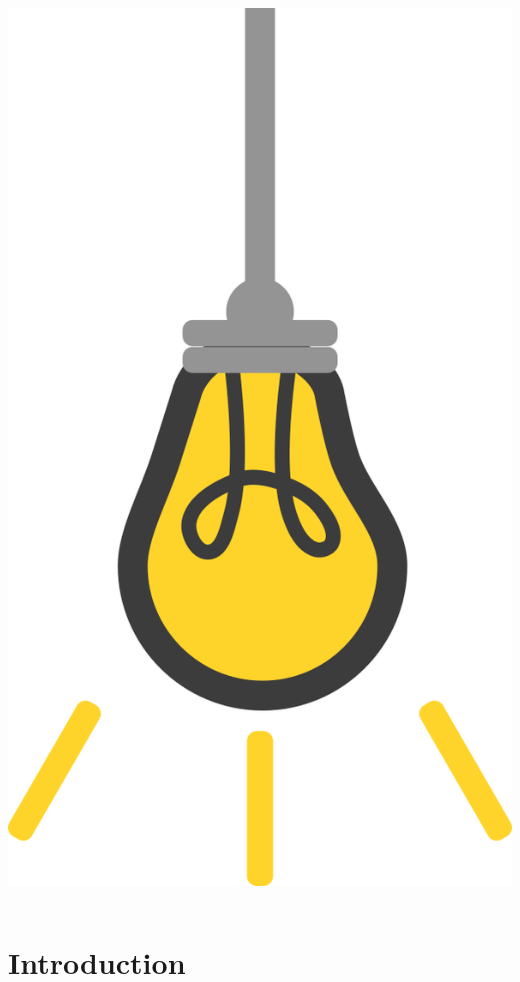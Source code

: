 \documentclass[9pt, aspectratio=169]{beamer}
\begin{document}
\begin{frame}
\begin{columns}
\begin{column}{0.2\textwidth}
            \includegraphics[angle=-30, origin=tr, width=1.5\textwidth]{lightbulb.png}
        \end{column}
    \end{columns}
\end{frame}

\section{Introduction}
\end{document}
